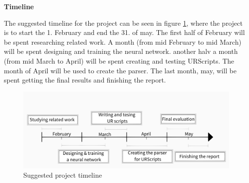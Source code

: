 \textbf{\Large{Timeline}}

The suggested timeline for the project 
can be seen in figure \ref{timeline}, where 
the project is to start the 1. February and end 
the 31. of may. 
The first half of February will be 
spent researching related work.
A month (from mid February to mid March) 
will be spent designing and training the 
neural network. another halv a month (from mid 
March to April)
will be spent creating and testing URScripts. 
The month of April will be used to create 
the parser.
The last month, may, will be spent getting 
the final results and finishing the report.

\begin{figure}[h]
    \centering
    \includegraphics[width=15cm]{img/Timeline2.png}
    \caption{Suggested project timeline}
    \label{timeline}
\end{figure}


